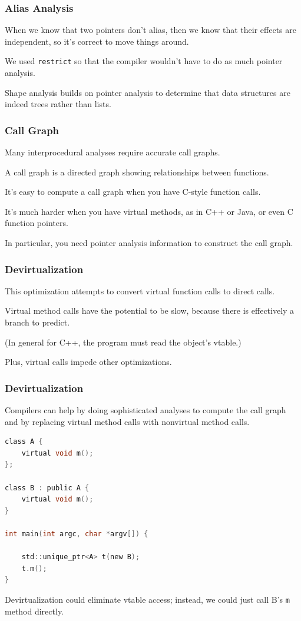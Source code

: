 \begin{frame}
\frametitle{Alias Analysis}

When we know that two pointers don't alias, then we know that their
effects are independent, so it's correct to move things around.

We used {\tt restrict} so that the
compiler wouldn't have to do as much pointer analysis. 

Shape analysis
builds on pointer analysis to determine that data structures are indeed
trees rather than lists.


\end{frame}

\begin{frame}
\frametitle{Call Graph}
Many interprocedural analyses require accurate call graphs. 

A \alert{call graph} is a directed graph showing relationships between
functions. 

It's easy to compute a call graph when you have C-style
function calls. 

It's much harder when you have virtual methods, as in
C++ or Java, or even C function pointers. 

In particular, you need pointer
analysis information to construct the call graph.


\end{frame}


\begin{frame}
\frametitle{Devirtualization}

This optimization attempts to convert virtual function calls to direct calls.  

Virtual method calls have the potential to be slow, because there is effectively a branch to predict. 

(In general for C++, the program must read the object's vtable.) 

Plus, virtual calls impede other optimizations.

\end{frame}

\begin{frame}[fragile]
\frametitle{Devirtualization}

Compilers can help by doing sophisticated analyses to compute the call graph and by replacing virtual method calls with nonvirtual method calls.  


  \begin{lstlisting}[language=C]
class A {
    virtual void m();
};

class B : public A {
    virtual void m();
}

int main(int argc, char *argv[]) {

    std::unique_ptr<A> t(new B);
    t.m();
}
  \end{lstlisting}

Devirtualization could eliminate vtable access; instead, we could just call B's {\tt m} method
directly.

\end{frame}

